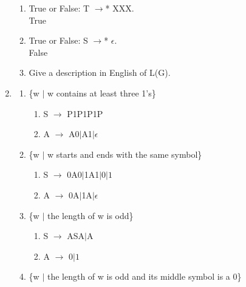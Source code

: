 \documentclass[a4paper]{article}
\begin{document}
\begin{enumerate}
\begin{enumerate}
      \item True or False: T  $\rightarrow$* XXX. \\ True

      \item True or False: S $\rightarrow$* $\epsilon$. \\ False

      \item  Give a description in English of L(G). \\ 

    \end{enumerate}

    \item
    \begin{enumerate}
      
      \item \{w $|$ w contains at least three 1's\}
      \begin{enumerate}

        \item S $\rightarrow$ P1P1P1P

        \item A $\rightarrow$ A0$|$A1$|\epsilon$ \\

      \end{enumerate}

      \item \{w $|$ w starts and ends with the same symbol\}
      \begin{enumerate}

        \item S $\rightarrow$ 0A0$|$1A1$|0|1$

        \item A $\rightarrow$ 0A$|$1A$|\epsilon$ \\

      \end{enumerate}

      \item  \{w $|$ the length of w is odd\}
      \begin{enumerate}

        \item S $\rightarrow$ ASA$|$A

        \item A $\rightarrow$ $0|1$ \\

      \end{enumerate}

      \item \{w $|$ the length of w is odd and its middle symbol is a 0\}
      \begin{enumerate}


\end{enumerate}
\end{enumerate}
\end{enumerate}
\end{document}
